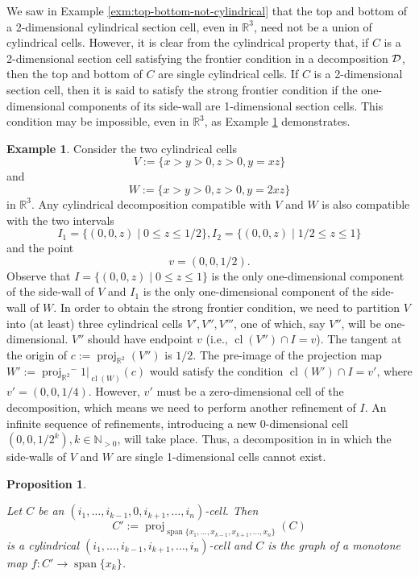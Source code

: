 \documentclass[
]{book}
\newtheorem{proposition}{Proposition}[chapter]
\theoremstyle{definition}
\theoremstyle{definition}
\newtheorem{example}{Example}[chapter]
\theoremstyle{definition}
\theoremstyle{definition}
\theoremstyle{remark}
\begin{document}
We saw in Example \ref{exm:top-bottom-not-cylindrical} that the top and bottom of a 2-dimensional cylindrical section cell, even in \(\mathbb{R}^3\), need not be a union of cylindrical cells.
However, it is clear from the cylindrical property that, if \(C\) is a 2-dimensional section cell satisfying the frontier condition in a decomposition \(\cal D\), then the top and bottom of \(C\) are single cylindrical cells.
If \(C\) is a 2-dimensional section cell, then it is said to satisfy the strong frontier condition if the one-dimensional components of its side-wall are 1-dimensional section cells. This condition may be impossible, even in \(\mathbb{R}^3\), as Example \ref{exm:side-wall} demonstrates.

\begin{example}
\protect\hypertarget{exm:side-wall}{}\label{exm:side-wall}Consider the two cylindrical cells
\[
V := \{ x > y > 0, z > 0, y = xz \}
\] and \[
W := \{ x > y > 0, z > 0, y = 2xz \}
\] in \(\mathbb{R}^3\).
Any cylindrical decomposition compatible with \(V\) and \(W\) is also compatible with the two intervals
\[
I_1 = \{ (0,0,z) \mid 0 \le z \le 1/2 \}, I_2 = \{ (0,0,z) \mid 1/2 \le z \le 1 \}
\]
and the point \[v = (0,0,1/2).\]
Observe that \(I = \{ (0,0,z) \mid 0 \le z \le 1 \}\) is the only one-dimensional component of the side-wall of \(V\) and \(I_1\) is the only one-dimensional component of the side-wall of \(W\). In order to obtain the strong frontier condition, we need to partition \(V\) into (at least) three cylindrical cells \(V',V'',V'''\), one of which, say \(V''\), will be one-dimensional. \(V''\) should have endpoint \(v\) (i.e., \({\operatorname{cl} \left( V'' \right)} \cap I = v\)).
The tangent at the origin of \(c := {\operatorname{proj}_{\mathbb{R}^{2}}}(V'')\) is \(1/2\). The pre-image of the projection map \(W' := {\operatorname{proj}_{\mathbb{R}^{2}}}^-1\vert_{{\operatorname{cl} \left( W \right)}}(c)\) would satisfy the condition \({\operatorname{cl} \left( W' \right)} \cap I = v'\), where \(v' = (0,0,1/4)\). However, \(v'\) must be a zero-dimensional cell of the decomposition, which means we need to perform another refinement of \(I\). An infinite sequence of refinements, introducing a new 0-dimensional cell \((0,0,1/2^k), k \in \mathbb{N}_{> 0}\), will take place. Thus, a decomposition in in which the side-walls of \(V\) and \(W\) are single 1-dimensional cells cannot exist.
\end{example}

\begin{proposition}
\protect\hypertarget{prp:delete-zero-index}{}\label{prp:delete-zero-index}\citep[Lemma 3.3]{bgv15}

Let \(C\) be an \((i_1,\ldots,i_{k-1},0,i_{k+1},\ldots,i_n)\)-cell. Then
\[C' := {\operatorname{proj}_{{\operatorname{span} \{x_1,\ldots,x_{k-1},x_{k+1},\ldots,x_n\}}}}(C)
\]
is a cylindrical \((i_1,\ldots,i_{k-1},i_{k+1},\ldots,i_n)\)-cell and \(C\) is the graph of a monotone map \(f : C' \to {\operatorname{span} \{x_k\}}\).
\end{proposition}
\end{document}
